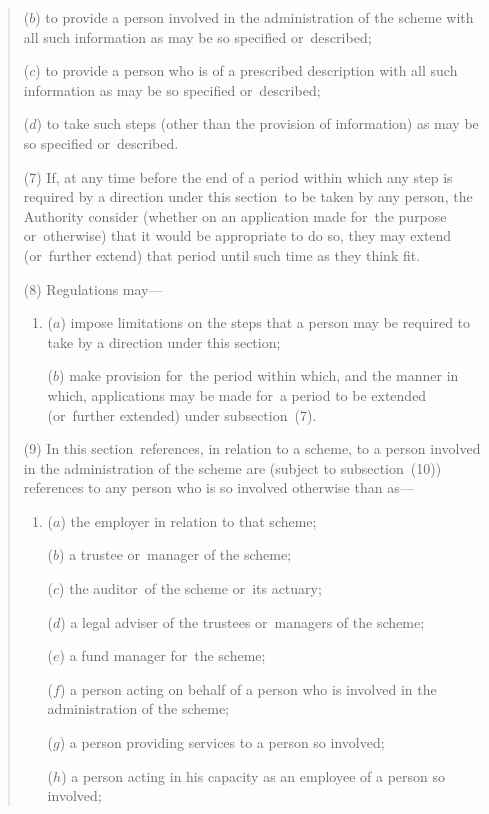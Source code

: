 \documentclass[12pt,a4paper]{article}
\begin{document}
\begin{quotation}
\begin{enumerate}
($b$) to provide a person involved in the administration of the scheme with all such information as may be so specified or~described;

($c$) to provide a person who is of a prescribed description with all such information as may be so specified or~described;

($d$) to take such steps (other than the provision of information) as may be so specified or~described.
\end{enumerate}

(7) If, at any time before the end of a period within which any step is required by a direction under this section~to be taken by any person, the Authority consider (whether on an application made for~the purpose or~otherwise) that it would be appropriate to do so, they may extend (or~further extend) that period until such time as they think fit.

(8) Regulations may—
\begin{enumerate}\item[]
($a$) impose limitations on the steps that a person may be required to take by a direction under this section;

($b$) make provision for~the period within which, and the manner in which, applications may be made for~a period to be extended (or~further extended) under subsection~(7).
\end{enumerate}

(9) In this section~references, in relation to a scheme, to a person involved in the administration of the scheme are (subject to subsection~(10)) references to any person who is so involved otherwise than as—
\begin{enumerate}\item[]
($a$) the employer in relation to that scheme;

($b$) a trustee or~manager of the scheme;

($c$) the auditor~of the scheme or~its actuary;

($d$) a legal adviser of the trustees or~managers of the scheme;

($e$) a fund manager for~the scheme;

($f$) a person acting on behalf of a person who is involved in the administration of the scheme;

($g$) a person providing services to a person so involved;

($h$) a person acting in his capacity as an employee of a person so involved;


\end{enumerate}
\end{quotation}
\end{document}
